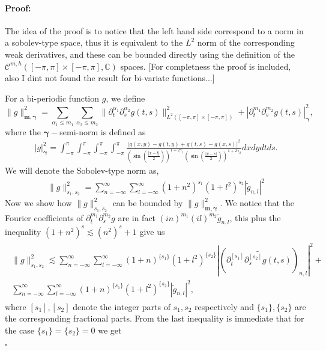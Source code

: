 \documentclass{article}
\newenvironment{proof}{\paragraph{Proof:}}{\hfill$\square$}
\newcommand{\todo}[1]{{\color{red}[#1]}}
\newcommand{\IC}{{\mathbb C}}
\newcommand{\cmspaceh}[4]{\mathcal{C}^{#1,#2} \left( #3, #4 \right)}
\begin{document}
\begin{proof}
The idea of the proof is to notice that the left hand side correspond to a norm in a sobolev-type space, thus it is equivalent to the $L^2$ norm of the corresponding weak derivatives, and these can be bounded directly using the definition of the $\cmspaceh{m}{h}{[-\pi,\pi]\times[-\pi,\pi]}{\IC}$ spaces. \todo{For completness the proof is included, also I dint not found the result for bi-variate functions...}

For a bi-periodic function $g$, we define 
$$\|g\|_{\mathbf{m},\mathbf{\gamma}}^2 = \sum_{\alpha_1 \leq m_1} \sum_{\alpha_2 \leq m_2} \| \partial_t^{\alpha_1} \partial_s^{\alpha_2} g(t,s) \|^2_{L^2([-\pi,\pi]\times [-\pi,\pi])}+  |\partial_t^{m_1} \partial_{s}^{m_2} g(t,s)|_{\mathbf{\gamma}}^2  ,$$
where the $\mathbf{\gamma}-$semi-norm is defined as 
\begin{align*}
|g|_{\mathbf{\gamma}}^2 = \int_{-\pi}^{\pi}  \int_{-\pi}^{\pi} \int_{-\pi}^{\pi}\int_{-\pi}^{\pi} \frac{| g(x,y)-g(t,y)+g(t,s)-g(x,s)|^2}
{\left(\sin\left(\frac{|x-t|}{2}\right)\right)^{1+2\gamma_1}\left(\sin\left(\frac{|y-s|}{2}\right)\right)^{1+2\gamma_2}}dx dy dt ds.
\end{align*}
We will denote the Sobolev-type norm as,
\begin{align}
\label{eq:sobnormtype}
\|g\|_{s_1,s_2}^2 = \sum_{n=-\infty}^\infty \sum_{l=-\infty}^\infty (1+n^2)^{s_1}(1+l^2)^{s_2}| \widetilde{g}_{n,l}|^2
\end{align}
Now we show how $\|g\|_{s_1,s_2}^2$ can be bounded by $ \|g\|_{\mathbf{m},\mathbf{\gamma}}^2$. We notice that the Fourier coefficients of $\partial_t^{m_1} \partial_s^{m_2} g$ are in fact $(i n)^{m_1} (i l)^{m_2} \widetilde{g}_{n,l}$, this plus the inequality $(1+n^2)^s \lesssim (n^2)^s+1$ give us 
\begin{align}
\label{eq:intdevs}
\begin{split}
\|g\|_{s_1,s_2}^2 \lesssim \sum_{n = -\infty}^\infty \sum_{l = -\infty}^\infty (1+n)^{\{s_1\}} (1+l^2)^{\{s_2\}} \left\vert\left(\widetilde{\partial_t^{[s_1]} \partial_s^{[s_2]}g(t,s)}\right)_{n,l}\right\vert^2+ \\
 \sum_{n = -\infty}^\infty \sum_{l = -\infty}^\infty (1+n)^{\{s_1\}} (1+l^2)^{\{s_2\}} \left\vert\widetilde{g}_{n,l}\right\vert^2
,
\end{split}
\end{align}
where $[s_1], [s_2]$ denote the integer parts of $s_1, s_2$ respectively and $\{s_1\}, \{s_2\}$ are the corresponding fractional parts. From the last inequality is immediate that for the case $\{s_1\}= \{s_2\} =0$ we get 

\end{proof}
\end{document}
